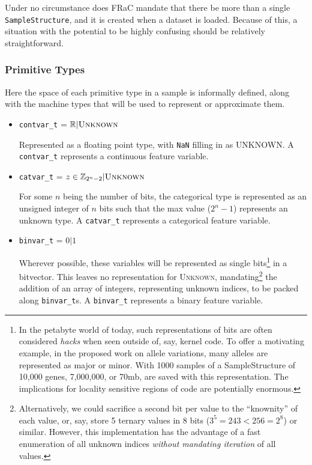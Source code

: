 \documentclass{article}
\begin{document}
\begin{multicols}{2}
Under no circumstance does FRaC mandate that there be more than a single \texttt{SampleStructure}, and it is created when a dataset is loaded.  Because of this, a situation with the potential to be highly confusing should be relatively straightforward.

\subsubsection{Primitive Types}

Here the space of each primitive type in a sample is informally defined, along with the machine types that will be used to represent or approximate them.

\begin{itemize}

\item \texttt{contvar\_t} = $\mathbb{R} | \textsc{Unknown}$

Represented as a floating point type, with \texttt{NaN} filling in as \textsc{UNKNOWN}.  A \texttt{contvar\_t} represents a continuous feature variable.

\item \texttt{catvar\_t} = $z \in \mathbb{Z}_{2^n-2} | \textsc{Unknown}$

For some $n$ being the number of bits, the categorical type is represented as an unsigned integer of $n$ bits such that the max value ($2^{n}-1$) represents an unknown type.  A \texttt{catvar\_t} represents a categorical feature variable.

\item \texttt{binvar\_t} = $0 | 1$

Wherever possible, these variables will be represented as single bits\footnote{In the petabyte world of today, such representations of bits are often considered \textit{hacks} when seen outside of, say, kernel code.  To offer a motivating example, in the proposed work on allele variations, many alleles are represented as major or minor.  With 1000 samples of a SampleStructure of 10,000 genes, 7,000,000, or 70mb, are saved with this representation.  The implications for locality sensitive regions of code are potentially enormous.} in a bitvector.  This leaves no representation for \textsc{Unknown}, mandating\footnote{Alternatively, we could sacrifice a second bit per value to the ``knownity'' of each value, or, say, store 5 ternary values in 8 bits ($3^5 = 243 < 256 = 2^8$) or similar.  However, this implementation has the advantage of a fast enumeration of all unknown indices \textit{without mandating iteration} of all values.}  the addition of an array of integers, representing unknown indices, to be packed along \texttt{binvar\_t}s.  A \texttt{binvar\_t} represents a binary feature variable.


\end{itemize}
\end{multicols}
\end{document}
